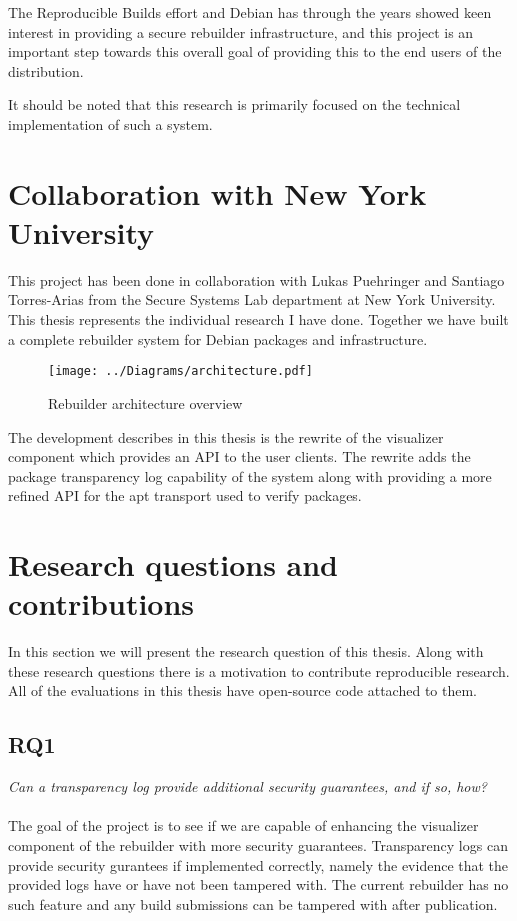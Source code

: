 \documentclass[../Main/thesis.tex]{subfiles}
\begin{document}
The Reproducible Builds effort and Debian has through the years showed keen
interest in providing a secure rebuilder infrastructure, and this project is
an important step towards this overall goal of providing this to the end users
of the distribution.

It should be noted that this research is primarily focused on the technical
implementation of such a system.

\section{Collaboration with New York University}\label{sec:collab}
This project has been done in collaboration with Lukas Puehringer and Santiago
Torres-Arias from the Secure Systems Lab department at New York University. This
thesis represents the individual research I have done. Together we have built a
complete rebuilder system for Debian packages and infrastructure. 

\begin{figure}[H]
\centering
\texttt{[image: ../Diagrams/architecture.pdf]}
\caption{Rebuilder architecture overview}
\label{fig:rebuilder_architecture}
\end{figure}

The development describes in this thesis is the rewrite of the visualizer
component which provides an API to the user clients. The rewrite adds the
package transparency log capability of the system along with providing a more
refined API for the apt transport used to verify packages.

\section{Research questions and contributions}\label{sec:rq}
In this section we will present the research question of this thesis.  Along
with these research questions there is a motivation to contribute reproducible
research. All of the evaluations in this thesis have open-source code attached
to them.

\subsection*{RQ1}%
\label{sub:rq1}
\textit{Can a transparency log provide additional security guarantees, and if so, how?}
\\\\
The goal of the project is to see if we are capable of enhancing the visualizer
component of the rebuilder with more security guarantees. Transparency logs can
provide security gurantees if implemented correctly, namely the evidence that
the provided logs have or have not been tampered with. The current rebuilder
has no such feature and any build submissions can be tampered with after
publication.
\end{document}
